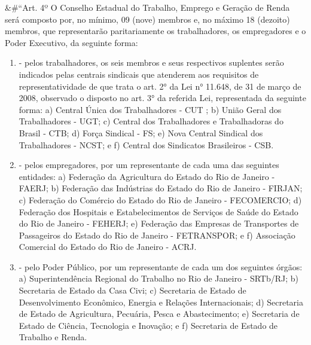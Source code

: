 \documentclass[10pt]{article}
\begin{document}
&#``Art. 4º O Conselho Estadual do Trabalho, Emprego e Geração de Renda será composto por, no mínimo, 09 (nove) membros e, no máximo 18 (dezoito) membros, que representarão paritariamente os trabalhadores, os empregadores e o Poder Executivo, da seguinte forma:
\begin{enumerate}[label=\Roman*]
\item - pelos trabalhadores, os seis membros e seus respectivos suplentes serão indicados pelas centrais sindicais que atenderem aos requisitos de representatividade de que trata o art. 2° da Lei n° 11.648, de 31 de março de 2008, observado o disposto no art. 3° da referida Lei, representada da seguinte forma:
a)  Central Única dos Trabalhadores - CUT ;
b) União Geral dos Trabalhadores - UGT;
c) Central dos Trabalhadores e Trabalhadoras do Brasil - CTB; 
d) Força Sindical - FS;
e)  Nova Central Sindical dos Trabalhadores - NCST; e
f) Central dos Sindicatos Brasileiros - CSB.
\item - pelos empregadores, por um representante de cada uma das seguintes entidades:
a) Federação da Agricultura do Estado do Rio de Janeiro - FAERJ; 
b) Federação das Indústrias do Estado do Rio de Janeiro - FIRJAN;
c) Federação do Comércio do Estado do Rio de Janeiro - FECOMERCIO; 
d) Federação dos Hospitais e Estabelecimentos de Serviços de Saúde do Estado do Rio de Janeiro - FEHERJ;
e) Federação das Empresas de Transportes de Passageiros do Estado do Rio de Janeiro - FETRANSPOR; e
f) Associação Comercial do Estado do Rio de Janeiro - ACRJ. 
\item - pelo Poder Público, por um representante de cada um dos seguintes órgãos:
a) Superintendência Regional do Trabalho no Rio de Janeiro - SRTb/RJ;
b) Secretaria de Estado da Casa Civi;
c) Secretaria de Estado de Desenvolvimento Econômico, Energia e Relações Internacionais;
d) Secretaria de Estado de Agricultura, Pecuária, Pesca e Abastecimento;
e) Secretaria de Estado de Ciência, Tecnologia e Inovação; e
f) Secretaria de Estado de Trabalho e Renda.


\end{enumerate}
\end{document}
